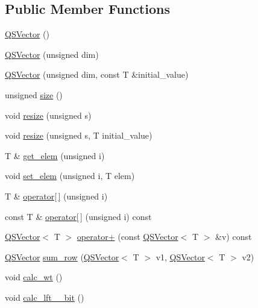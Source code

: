 \subsection*{Public Member Functions}
\begin{DoxyCompactItemize}
\item 
\hyperlink{classQS_1_1numeric_1_1QSVector_aeb0c21cc55d25c65c88dc8d8defa93cb}{Q\-S\-Vector} ()
\item 
\hyperlink{classQS_1_1numeric_1_1QSVector_adce6cb6eef5859a7bb6d174d7b84a21f}{Q\-S\-Vector} (unsigned dim)
\item 
\hyperlink{classQS_1_1numeric_1_1QSVector_a143b985f3dfb8bc3b52f4a0faff9981e}{Q\-S\-Vector} (unsigned dim, const T \&initial\-\_\-value)
\item 
unsigned \hyperlink{classQS_1_1numeric_1_1QSVector_a56692c72c5541b8c983d8b37294f9a2f}{size} ()
\item 
void \hyperlink{classQS_1_1numeric_1_1QSVector_a8aa913d007b2d79eeb4b7c4c2fb497e6}{resize} (unsigned s)
\item 
void \hyperlink{classQS_1_1numeric_1_1QSVector_abdcc57456318adb37356e4a73e9fc4b7}{resize} (unsigned s, T initial\-\_\-value)
\item 
T \& \hyperlink{classQS_1_1numeric_1_1QSVector_ad39d0ddea18060d9a79f713660e3346d}{get\-\_\-elem} (unsigned i)
\item 
void \hyperlink{classQS_1_1numeric_1_1QSVector_a1a395a36ee4f8875a16af099080afe4f}{set\-\_\-elem} (unsigned i, T elem)
\item 
T \& \hyperlink{classQS_1_1numeric_1_1QSVector_a1f0bd5a0b83d2ee57dc69f58933c2076}{operator\mbox{[}$\,$\mbox{]}} (unsigned i)
\item 
const T \& \hyperlink{classQS_1_1numeric_1_1QSVector_ad9079cb9bcbf3211cb933b7cfcce4491}{operator\mbox{[}$\,$\mbox{]}} (unsigned i) const 
\item 
\hyperlink{classQS_1_1numeric_1_1QSVector}{Q\-S\-Vector}$<$ T $>$ \hyperlink{classQS_1_1numeric_1_1QSVector_ad6f11d4eab04dc2c95bcdde5591a4acc}{operator+} (const \hyperlink{classQS_1_1numeric_1_1QSVector}{Q\-S\-Vector}$<$ T $>$ \&v) const 
\item 
\hyperlink{classQS_1_1numeric_1_1QSVector}{Q\-S\-Vector} \hyperlink{classQS_1_1numeric_1_1QSVector_a65126676b161a01e02586b986ea05469}{sum\-\_\-row} (\hyperlink{classQS_1_1numeric_1_1QSVector}{Q\-S\-Vector}$<$ T $>$ v1, \hyperlink{classQS_1_1numeric_1_1QSVector}{Q\-S\-Vector}$<$ T $>$ v2)
\item 
void \hyperlink{classQS_1_1numeric_1_1QSVector_ad7953ae4a0beab7a724f2f3819de2e45}{calc\-\_\-wt} ()
\item 
void \hyperlink{classQS_1_1numeric_1_1QSVector_ae35ef76dea59a9a68de6a19de367fef2}{calc\-\_\-lft\-\_\-\_\-bit} ()
\end{DoxyCompactItemize}


